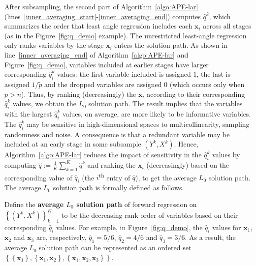 \documentclass[11pt,authoryear]{elsarticle}
\begin{document}
After subsampling, the second part of Algorithm~\ref{algo:APE-lar} (lines~\ref{inner_averaging_start}-\ref{inner_averaging_end}) computes $\widehat{q}^k$, which summarizes the order that least angle regression includes each $\mathbf{x}_i$ across all stages (as in the Figure~\ref{fig:q_demo} example). The unrestricted least-angle regression only ranks variables by the stage $\mathbf{x}_i$ enters the solution path. As shown in line~\ref{inner_averaging_end} of Algorithm~\ref{algo:APE-lar} and Figure~\ref{fig:q_demo}, variables included at earlier stages have larger corresponding $\widehat{q}^k_i$ values: the first variable included is assigned $1$, the last is assigned $1/\widetilde{p}$ and the dropped variables are assigned $0$ (which occurs only when $p > n$). Thus, by ranking (decreasingly) the $\mathbf{x}_i$ according to their corresponding $\widehat{q}^k_i$ values, we obtain the $L_0$ solution path. The \citet[Theorem 2]{zhang09} result implies that the variables with the largest $\widehat{q}^k_i$ values, on average, are more likely to be informative variables. The $\widehat{q}^k_i$ may be sensitive in high-dimensional spaces to multicollinearity, sampling randomness and noise. A consequence is that a redundant variable may be included at an early stage in some subsample $\left( Y^k, X^k \right)$. Hence, Algorithm~\ref{algo:APE-lar} reduces the impact of sensitivity in the $\widehat{q}^k_i$ values by computing $\widehat{q} := \frac{1}{K} \sum_{k=1}^{K} \widehat{q}^k$ and ranking the $\mathbf{x}_i$ (decreasingly) based on the corresponding value of $\widehat{q}_i$ (the $i$\textsuperscript{th} entry of $\widehat{q}$), to get the average $L_0$ solution path. The average $L_0$ solution path is formally defined as follows.
%
\begin{definition}
  Define the \textbf{average $L_0$ solution path} of forward regression on $\left\{ \left( Y^k, X^k \right) \right\}_{k=1}^{K}$ to be the decreasing rank order of variables based on their corresponding $\widehat{q}_i$ values. For example, in Figure~\ref{fig:q_demo}, the $\widehat{q}_i$ values for $\mathbf{x}_1$, $\mathbf{x}_2$ and $\mathbf{x}_3$ are, respectively, $\widehat{q}_1 = 5/6$, $\widehat{q}_2 = 4/6$ and $\widehat{q}_3 = 3/6$. As a result, the average $L_0$ solution path can be represented as an ordered set $\left\{ \left\{ \mathbf{x}_1 \right\}, \left\{ \mathbf{x}_1, \mathbf{x}_2 \right\}, \left\{ \mathbf{x}_1, \mathbf{x}_2, \mathbf{x}_3 \right\} \right\}$.
  \label{def:L_0_solution_path}
\end{definition}
\end{document}
